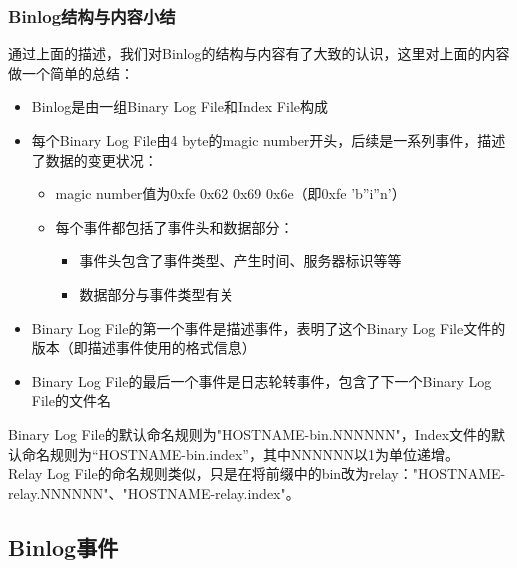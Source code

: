 \documentclass[a4paper, titlepage, 10pt, bookmark]{article}
\begin{document}
\subsubsection{Binlog结构与内容小结}
通过上面的描述，我们对Binlog的结构与内容有了大致的认识，这里对上面的内容做一个简单的总结：
\begin{itemize}
    \item Binlog是由一组Binary Log File和Index File构成
    \item 每个Binary Log File由4 byte的magic number开头，后续是一系列事件，描述了数据的变更状况：
    \begin{itemize}
        \item magic number值为0xfe 0x62 0x69 0x6e（即0xfe 'b''i''n'）
        \item 每个事件都包括了事件头和数据部分：
        \begin{itemize}
            \item 事件头包含了事件类型、产生时间、服务器标识等等
            \item 数据部分与事件类型有关
        \end{itemize}
    \end{itemize}
    \item Binary Log File的第一个事件是描述事件，表明了这个Binary Log File文件的版本（即描述事件使用的格式信息）
    \item Binary Log File的最后一个事件是日志轮转事件，包含了下一个Binary Log File的文件名
\end{itemize}

Binary Log File的默认命名规则为"HOSTNAME-bin.NNNNNN"，Index文件的默认命名规则为“HOSTNAME-bin.index”，其中NNNNNN以1为单位递增。\\

Relay Log File的命名规则类似，只是在将前缀中的bin改为relay："HOSTNAME-relay.NNNNNN"、"HOSTNAME-relay.index"。



\subsection{Binlog事件}
\end{document}
